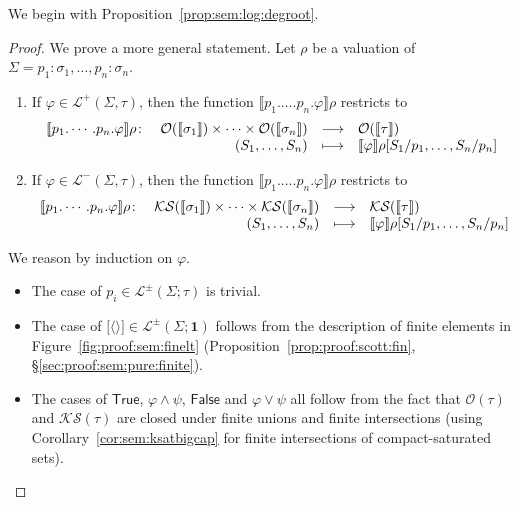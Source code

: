 \documentclass[%
  a4paper,
  UKenglish,
  cleveref,
  autoref,
  thm-restate,
  numberwithinsect,
]{lipics-v2021}
\newcommand\longto\longrightarrow
\newcommand\pair[1]{{\langle #1\rangle}}
\newcommand\one{\mathbf{1}}	%
\newcommand\I[1]{\llbracket #1 \rrbracket} %
\newcommand\SP{S}			%
\newcommand\Open{\mathcal{O}}		%
\newcommand\K{\mathcal{K}}		%
\newcommand\Sat{\mathcal{S}}		%
\newcommand\temp[1]{\mathsf{#1}}
\newcommand\True{\temp{True}}
\newcommand\False{\temp{False}}
\newcommand\val{\rho}	%
\newcommand\PT{\tau}		%
\newcommand\PTbis{\sigma}	%
\newcommand\FP{p}
\newcommand\FPEnv{\Sigma}
\newcommand\Lang{\mathcal{L}}
\newcommand\form[1]{\lbrack #1 \rbrack}
\begin{document}
We begin with Proposition~\ref{prop:sem:log:degroot}.

\PropFormdeGroot*

\begin{proof}
We prove a more general statement.
Let $\val$ be a valuation of
$\FPEnv = \FP_1\colon \PTbis_1, \dots, \FP_n\colon \PTbis_n$.
\begin{enumerate}[(1)]
\item
If $\varphi \in \Lang^+(\FPEnv,\PT)$,
then the function $\I{\FP_1.\dots.\FP_n.\varphi}\val$
restricts to
\[
\begin{array}{l r c l}
  \I{\FP_1.\cdots.\FP_n.\varphi}\val \colon
& \Open(\I{\PTbis_1}) \times \dots \times \Open(\I{\PTbis_n})
& \longto
& \Open(\I{\PT})
\\
%
& (\SP_1,\dots,\SP_n)
& \longmapsto
& \I{\varphi}\val[\SP_1 / \FP_1, \dots, \SP_n / \FP_n]
\end{array}
\]

\item
If $\varphi \in \Lang^-(\FPEnv,\PT)$,
then the function $\I{\FP_1.\dots.\FP_n.\varphi}\val$
restricts to
\[
\begin{array}{l r c l}
  \I{\FP_1.\cdots.\FP_n.\varphi}\val \colon
& \K\Sat(\I{\PTbis_1}) \times \dots \times \K\Sat(\I{\PTbis_n})
& \longto
& \K\Sat(\I{\PT})
\\
%
& (\SP_1,\dots,\SP_n)
& \longmapsto
& \I{\varphi}\val[\SP_1 / \FP_1, \dots, \SP_n / \FP_n]
\end{array}
\]
\end{enumerate}

We reason by induction on $\varphi$.
\begin{itemize}
\item
The case of $\FP_i \in \Lang^\pm(\FPEnv;\PT)$ is trivial.

\item
The case of $\form{\pair{}} \in \Lang^\pm(\FPEnv;\one)$
follows from the description of finite elements
in Figure~\ref{fig:proof:sem:finelt}
(Proposition~\ref{prop:proof:scott:fin}, \S\ref{sec:proof:sem:pure:finite}).

\item
The cases of $\True$, $\varphi \land \psi$, $\False$ and $\varphi \lor \psi$
all follow from the fact that $\Open(\PT)$ and $\K\Sat(\PT)$
are closed under finite unions and finite intersections
(using Corollary~\ref{cor:sem:ksatbigcap}
for finite intersections of compact-saturated sets).


\end{itemize}
\end{proof}
\end{document}
